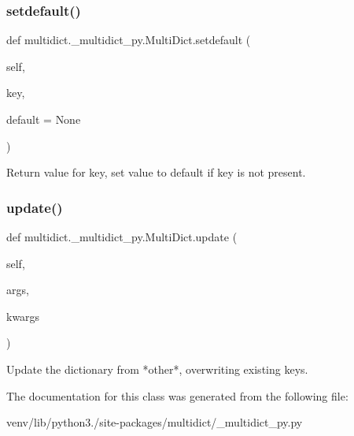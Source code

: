 \subsubsection{\texorpdfstring{setdefault()}{setdefault()}}
{\footnotesize\ttfamily def multidict.\+\_\+multidict\+\_\+py.\+Multi\+Dict.\+setdefault (\begin{DoxyParamCaption}\item[{}]{self,  }\item[{}]{key,  }\item[{}]{default = {\ttfamily None} }\end{DoxyParamCaption})}

\begin{DoxyVerb}Return value for key, set value to default if key is not present.\end{DoxyVerb}
 \mbox{\label{classmultidict_1_1__multidict__py_1_1_multi_dict_afc0060b5da1db80a6d2e7ec5ec17b1dc}} 
\subsubsection{\texorpdfstring{update()}{update()}}
{\footnotesize\ttfamily def multidict.\+\_\+multidict\+\_\+py.\+Multi\+Dict.\+update (\begin{DoxyParamCaption}\item[{}]{self,  }\item[{}]{args,  }\item[{}]{kwargs }\end{DoxyParamCaption})}

\begin{DoxyVerb}Update the dictionary from *other*, overwriting existing keys.\end{DoxyVerb}
 

The documentation for this class was generated from the following file\+:\begin{DoxyCompactItemize}
\item 
venv/lib/python3./site-\/packages/multidict/\+\_\+multidict\+\_\+py.\+py\end{DoxyCompactItemize}
